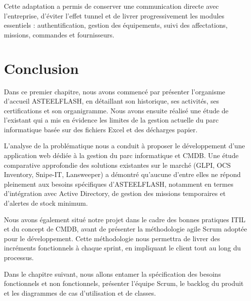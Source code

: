 Cette adaptation a permis de conserver une communication directe avec l'entreprise, d'éviter l'effet tunnel et de livrer progressivement les modules essentiels : authentification, gestion des équipements, suivi des affectations, missions, commandes et fournisseurs.
\section{Conclusion}
Dans ce premier chapitre, nous avons commencé par présenter l'organisme d'accueil ASTEELFLASH, en détaillant son historique, ses activités, ses certifications et son organigramme. Nous avons ensuite réalisé une étude de l'existant qui a mis en évidence les limites de la gestion actuelle du parc informatique basée sur des fichiers Excel et des décharges papier.

L'analyse de la problématique nous a conduit à proposer le développement d'une application web dédiée à la gestion du parc informatique et CMDB. Une étude comparative approfondie des solutions existantes sur le marché (GLPI, OCS Inventory, Snipe-IT, Lansweeper) a démontré qu'aucune d'entre elles ne répond pleinement aux besoins spécifiques d'ASTEELFLASH, notamment en termes d'intégration avec Active Directory, de gestion des missions temporaires et d'alertes de stock minimum.

Nous avons également situé notre projet dans le cadre des bonnes pratiques ITIL et du concept de CMDB, avant de présenter la méthodologie agile Scrum adoptée pour le développement. Cette méthodologie nous permettra de livrer des incréments fonctionnels à chaque sprint, en impliquant le client tout au long du processus.

Dans le chapitre suivant, nous allons entamer la spécification des besoins fonctionnels et non fonctionnels, présenter l'équipe Scrum, le backlog du produit et les diagrammes de cas d'utilisation et de classes.

